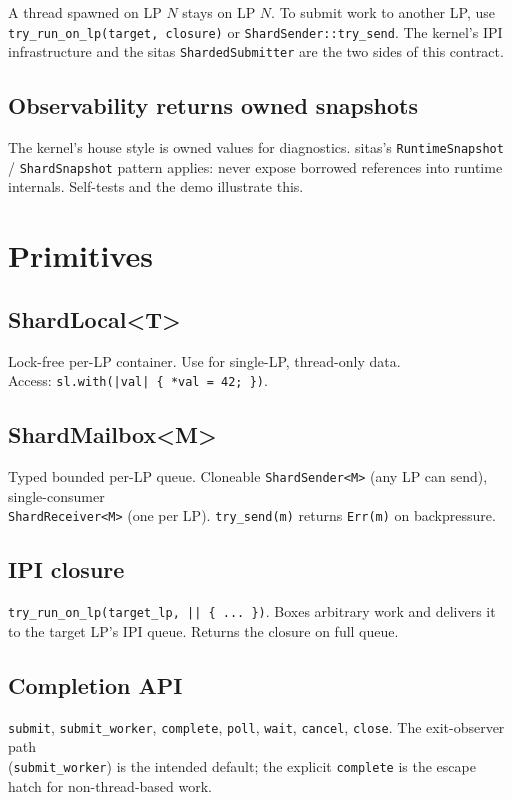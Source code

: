 A thread spawned on LP $N$ stays on LP $N$. To submit work to another LP, use
\texttt{try\_run\_on\_lp(target, closure)} or \texttt{ShardSender::try\_send}.
The kernel's IPI infrastructure and the sitas \texttt{ShardedSubmitter} are
the two sides of this contract.

\subsection{Observability returns owned snapshots}

The kernel's house style is owned values for diagnostics. sitas's
\texttt{RuntimeSnapshot} / \texttt{ShardSnapshot} pattern applies: never
expose borrowed references into runtime internals. Self-tests and the demo
illustrate this.

\section{Primitives}

\subsection{ShardLocal<T>} Lock-free per-LP container. Use for single-LP,
thread-only data. \\Access: \texttt{sl.with(|val| \{ *val = 42; \})}.

\subsection{ShardMailbox<M>} Typed bounded per-LP queue. Cloneable
\texttt{ShardSender<M>} (any LP can send), single-consumer\\
\texttt{ShardReceiver<M>} (one per LP). \texttt{try\_send(m)} returns
\texttt{Err(m)} on backpressure.

\subsection{IPI closure} \texttt{try\_run\_on\_lp(target\_lp, || \{ ... \})}.
Boxes arbitrary work and delivers it to the target LP's IPI queue. Returns the
closure on full queue.

\subsection{Completion API} \texttt{submit}, \texttt{submit\_worker},
\texttt{complete}, \texttt{poll}, \texttt{wait}, \texttt{cancel}, \texttt{close}.
The exit-observer path \\ (\texttt{submit\_worker}) is the intended default; the
explicit \texttt{complete} is the escape hatch for non-thread-based work.

